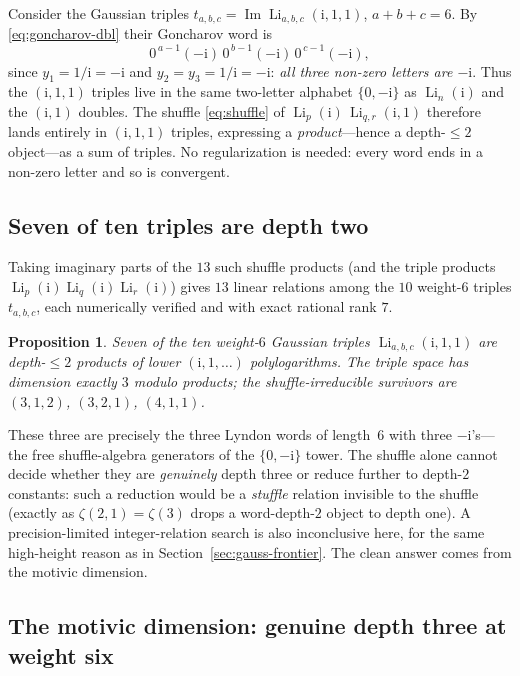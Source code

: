 \documentclass[11pt]{article}
\DeclareMathOperator{\Li}{Li}
\DeclareMathOperator{\Imag}{Im}
\newcommand{\iu}{\mathrm{i}}
\theoremstyle{plain}
\newtheorem{proposition}[theorem]{Proposition}
\theoremstyle{remark}
\begin{document}
Consider the Gaussian triples $t_{a,b,c}=\Imag\Li_{a,b,c}(\iu,1,1)$, $a+b+c=6$. By
\eqref{eq:goncharov-dbl} their Goncharov word is
\[
  0^{\,a-1}(-\iu)\,0^{\,b-1}(-\iu)\,0^{\,c-1}(-\iu),
\]
since $y_1=1/\iu=-\iu$ and $y_2=y_3=1/\iu=-\iu$: \emph{all three non-zero letters are $-\iu$}. Thus the
$(\iu,1,1)$ triples live in the same two-letter alphabet $\{0,-\iu\}$ as $\Li_n(\iu)$ and the $(\iu,1)$
doubles. The shuffle \eqref{eq:shuffle} of $\Li_p(\iu)\,\Li_{q,r}(\iu,1)$ therefore lands entirely in
$(\iu,1,1)$ triples, expressing a \emph{product}---hence a depth-$\le2$ object---as a sum of triples.
No regularization is needed: every word ends in a non-zero letter and so is convergent.

\subsection{Seven of ten triples are depth two}

Taking imaginary parts of the $13$ such shuffle products (and the triple products $\Li_p(\iu)\Li_q(\iu)\Li_r(\iu)$)
gives $13$ linear relations among the $10$ weight-$6$ triples $t_{a,b,c}$, each numerically verified
and with exact rational rank $7$.

\begin{proposition}\label{prop:7of10}
Seven of the ten weight-$6$ Gaussian triples $\Li_{a,b,c}(\iu,1,1)$ are depth-$\le2$ products of lower
$(\iu,1,\dots)$ polylogarithms. The triple space has dimension exactly $3$ modulo products; the
shuffle-irreducible survivors are $(3,1,2)$, $(3,2,1)$, $(4,1,1)$.
\end{proposition}

These three are precisely the three Lyndon words of length~$6$ with three $-\iu$'s---the free
shuffle-algebra generators of the $\{0,-\iu\}$ tower. The shuffle alone cannot decide whether they are
\emph{genuinely} depth three or reduce further to depth-$2$ constants: such a reduction would be a
\emph{stuffle} relation invisible to the shuffle (exactly as $\zeta(2,1)=\zeta(3)$ drops a
word-depth-$2$ object to depth one). A precision-limited integer-relation search is also inconclusive
here, for the same high-height reason as in Section~\ref{sec:gauss-frontier}. The clean answer comes
from the motivic dimension.

\subsection{The motivic dimension: genuine depth three at weight six}
\end{document}
